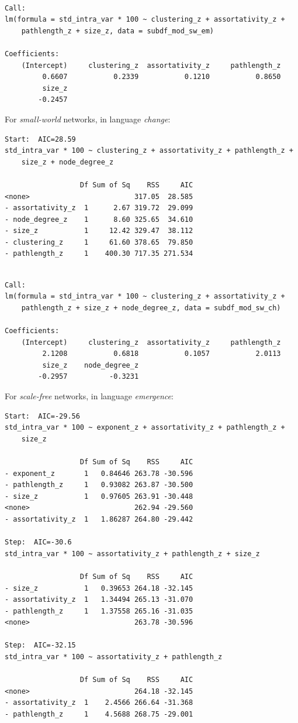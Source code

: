 \documentclass[
]{article}
\begin{document}
\begin{verbatim}

Call:
lm(formula = std_intra_var * 100 ~ clustering_z + assortativity_z + 
    pathlength_z + size_z, data = subdf_mod_sw_em)

Coefficients:
    (Intercept)     clustering_z  assortativity_z     pathlength_z  
         0.6607           0.2339           0.1210           0.8650  
         size_z  
        -0.2457  
\end{verbatim}

For \emph{small-world} networks, in language \emph{change}:

\begin{verbatim}
Start:  AIC=28.59
std_intra_var * 100 ~ clustering_z + assortativity_z + pathlength_z + 
    size_z + node_degree_z

                  Df Sum of Sq    RSS     AIC
<none>                         317.05  28.585
- assortativity_z  1      2.67 319.72  29.099
- node_degree_z    1      8.60 325.65  34.610
- size_z           1     12.42 329.47  38.112
- clustering_z     1     61.60 378.65  79.850
- pathlength_z     1    400.30 717.35 271.534
\end{verbatim}

\begin{verbatim}

Call:
lm(formula = std_intra_var * 100 ~ clustering_z + assortativity_z + 
    pathlength_z + size_z + node_degree_z, data = subdf_mod_sw_ch)

Coefficients:
    (Intercept)     clustering_z  assortativity_z     pathlength_z  
         2.1208           0.6818           0.1057           2.0113  
         size_z    node_degree_z  
        -0.2957          -0.3231  
\end{verbatim}

For \emph{scale-free} networks, in language \emph{emergence}:

\begin{verbatim}
Start:  AIC=-29.56
std_intra_var * 100 ~ exponent_z + assortativity_z + pathlength_z + 
    size_z

                  Df Sum of Sq    RSS     AIC
- exponent_z       1   0.84646 263.78 -30.596
- pathlength_z     1   0.93082 263.87 -30.500
- size_z           1   0.97605 263.91 -30.448
<none>                         262.94 -29.560
- assortativity_z  1   1.86287 264.80 -29.442

Step:  AIC=-30.6
std_intra_var * 100 ~ assortativity_z + pathlength_z + size_z

                  Df Sum of Sq    RSS     AIC
- size_z           1   0.39653 264.18 -32.145
- assortativity_z  1   1.34494 265.13 -31.070
- pathlength_z     1   1.37558 265.16 -31.035
<none>                         263.78 -30.596

Step:  AIC=-32.15
std_intra_var * 100 ~ assortativity_z + pathlength_z

                  Df Sum of Sq    RSS     AIC
<none>                         264.18 -32.145
- assortativity_z  1    2.4566 266.64 -31.368
- pathlength_z     1    4.5688 268.75 -29.001
\end{verbatim}
\end{document}
